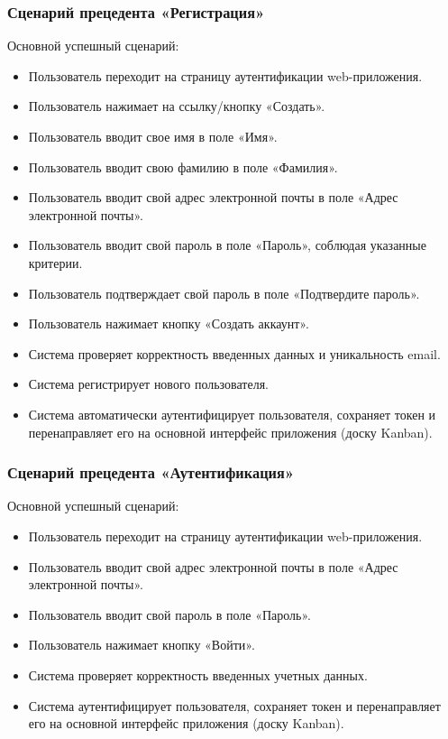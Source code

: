 \subsubsection{Сценарий прецедента «Регистрация»}
Основной успешный сценарий:
\begin{itemize}
	\item Пользователь переходит на страницу аутентификации web-приложения.
	\item Пользователь нажимает на ссылку/кнопку «Создать».
	\item Пользователь вводит свое имя в поле «Имя».
	\item Пользователь вводит свою фамилию в поле «Фамилия».
	\item Пользователь вводит свой адрес электронной почты в поле «Адрес электронной почты».
	\item Пользователь вводит свой пароль в поле «Пароль», соблюдая указанные критерии.
	\item Пользователь подтверждает свой пароль в поле «Подтвердите пароль».
	\item Пользователь нажимает кнопку «Создать аккаунт».
	\item Система проверяет корректность введенных данных и уникальность email.
	\item Система регистрирует нового пользователя.
	\item Система автоматически аутентифицирует пользователя, сохраняет токен и перенаправляет его на основной интерфейс приложения (доску Kanban).
\end{itemize}

\subsubsection{Сценарий прецедента «Аутентификация»}
Основной успешный сценарий:
\begin{itemize}
	\item Пользователь переходит на страницу аутентификации web-приложения.
	\item Пользователь вводит свой адрес электронной почты в поле «Адрес электронной почты».
	\item Пользователь вводит свой пароль в поле «Пароль».
	\item Пользователь нажимает кнопку «Войти».
	\item Система проверяет корректность введенных учетных данных.
	\item Система аутентифицирует пользователя, сохраняет токен и перенаправляет его на основной интерфейс приложения (доску Kanban).
\end{itemize}

